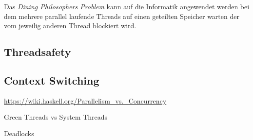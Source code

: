 Das \emph{Dining Philosophers Problem} kann auf die Informatik angewendet werden bei dem mehrere parallel laufende Threads auf einen geteilten Speicher warten der vom jeweilig anderen Thread blockiert wird. 

\subsection{Threadsafety}




\subsection{Context Switching}

\url{https://wiki.haskell.org/Parallelism_vs._Concurrency}

Green Threads vs System Threads

Deadlocks